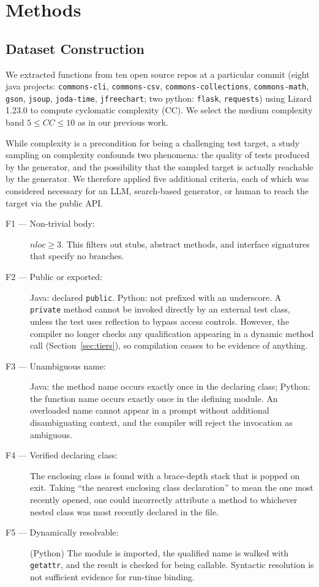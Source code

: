 \section{Methods}\label{sec:method}

\subsection{Dataset Construction}\label{sec:dataset}

We extracted functions from ten open source repos at a particular commit (eight java projects:
\texttt{commons-cli}, \texttt{commons-csv}, \texttt{commons-collections},
\texttt{commons-math}, \texttt{gson}, \texttt{jsoup}, \texttt{joda-time},
\texttt{jfreechart}; two python: \texttt{flask}, \texttt{requests}) using Lizard 1.23.0 to
compute cyclomatic complexity (CC). We select the medium complexity band $5 \le CC \le 10$ as
in our previous work.

While complexity is a precondition for being a challenging test target, a study sampling on
complexity confounds two phenomena: the quality of tests produced by the generator, and the
possibility that the sampled target is actually reachable by the generator. We therefore
applied five additional criteria, each of which was considered necessary for an LLM,
search-based generator, or human to reach the target via the public API.

\begin{description}
  \item[F1 --- Non-trivial body:] $nloc \ge 3$. This filters out stubs, abstract methods, and
    interface signatures that specify no branches.
  \item[F2 --- Public or exported:] Java: declared \texttt{public}. Python: not prefixed with
    an underscore. A \texttt{private} method cannot be invoked directly by an external test
    class, unless the test uses reflection to bypass access controls. However, the compiler no
    longer checks any qualification appearing in a dynamic method call
    (Section~\ref{sec:tiers}), so compilation ceases to be evidence of anything.
  \item[F3 --- Unambiguous name:] Java: the method name occurs exactly once in the declaring
    class; Python: the function name occurs exactly once in the defining module. An overloaded
    name cannot appear in a prompt without additional disambiguating context, and the compiler
    will reject the invocation as ambiguous.
  \item[F4 --- Verified declaring class:] The enclosing class is found with a brace-depth stack
    that is popped on exit. Taking ``the nearest enclosing class declaration'' to mean the one
    most recently opened, one could incorrectly attribute a method to whichever nested class
    was most recently declared in the file.
  \item[F5 --- Dynamically resolvable:] (Python) The module is imported, the qualified name is
    walked with \texttt{getattr}, and the result is checked for being callable. Syntactic
    resolution is not sufficient evidence for run-time binding.
\end{description}

